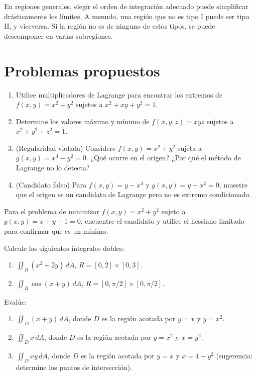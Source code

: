 \begin{rem}
En regiones generales, elegir el orden de integración adecuado puede simplificar drásticamente los límites. A menudo, una región que no es tipo I puede ser tipo II, y viceversa. Si la región no es de ninguno de estos tipos, se puede descomponer en varias subregiones.
\end{rem}

\section{Problemas propuestos}

\begin{prob}
\begin{enumerate}
    \item Utilice multiplicadores de Lagrange para encontrar los extremos de $f(x,y)=x^2+y^2$ sujetos a $x^2+xy+y^2=1$.
    \item Determine los valores máximo y mínimo de $f(x,y,z)=xyz$ sujetos a $x^2+y^2+z^2=1$.
    \item (Regularidad violada) Considere $f(x,y)=x^2+y^2$ sujeta a $g(x,y)=x^3-y^2=0$. ¿Qué ocurre en el origen? ¿Por qué el método de Lagrange no lo detecta?
    \item (Candidato falso) Para $f(x,y)=y-x^4$ y $g(x,y)=y-x^2=0$, muestre que el origen es un candidato de Lagrange pero no es extremo condicionado.
\end{enumerate}
\end{prob}

\begin{prob}
Para el problema de minimizar $f(x,y)=x^2+y^2$ sujeto a $g(x,y)=x+y-1=0$, encuentre el candidato y utilice el hessiano limitado para confirmar que es un mínimo.
\end{prob}

\begin{prob}
Calcule las siguientes integrales dobles:
\begin{enumerate}
    \item $\displaystyle\iint_R (x^2+2y)\,dA$, $R=[0,2]\times[0,3]$.
    \item $\displaystyle\iint_R \cos(x+y)\,dA$, $R=[0,\pi/2]\times[0,\pi/2]$.
\end{enumerate}
\end{prob}

\begin{prob}
Evalúe:
\begin{enumerate}
    \item $\displaystyle\iint_D (x+y)\,dA$, donde $D$ es la región acotada por $y=x$ y $y=x^2$.
    \item $\displaystyle\iint_D x\,dA$, donde $D$ es la región acotada por $y=x^2$ y $x=y^2$.
    \item $\displaystyle\iint_D xy\,dA$, donde $D$ es la región acotada por $y=x$ y $x=4-y^2$ (sugerencia: determine los puntos de intersección).
\end{enumerate}
\end{prob}


